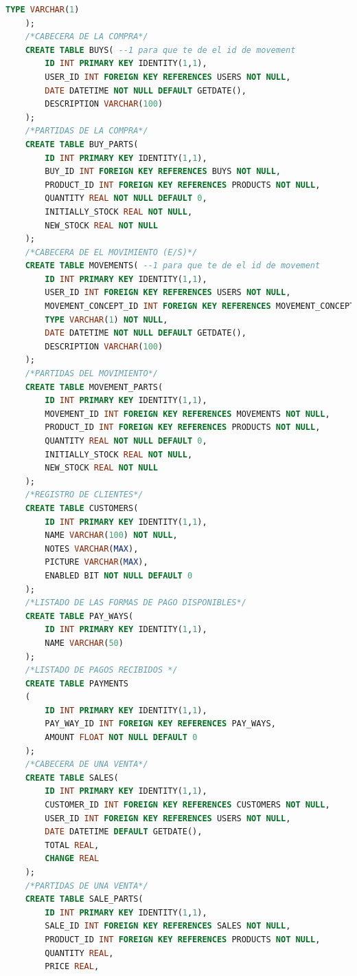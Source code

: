 \documentclass[a4paper,DIV=12]{scrreprt}
\begin{document}
\begin{lstlisting}[language={SQL}]
        TYPE VARCHAR(1)
    );
    /*CABECERA DE LA COMPRA*/
    CREATE TABLE BUYS( --1 para que te de el id de movement
        ID INT PRIMARY KEY IDENTITY(1,1),
        USER_ID INT FOREIGN KEY REFERENCES USERS NOT NULL,
        DATE DATETIME NOT NULL DEFAULT GETDATE(),
        DESCRIPTION VARCHAR(100)
    );
    /*PARTIDAS DE LA COMPRA*/
    CREATE TABLE BUY_PARTS(  
        ID INT PRIMARY KEY IDENTITY(1,1),
        BUY_ID INT FOREIGN KEY REFERENCES BUYS NOT NULL,
        PRODUCT_ID INT FOREIGN KEY REFERENCES PRODUCTS NOT NULL,
        QUANTITY REAL NOT NULL DEFAULT 0,
        INITIALLY_STOCK REAL NOT NULL,
        NEW_STOCK REAL NOT NULL
    );
    /*CABECERA DE EL MOVIMIENTO (E/S)*/
    CREATE TABLE MOVEMENTS( --1 para que te de el id de movement
        ID INT PRIMARY KEY IDENTITY(1,1),
        USER_ID INT FOREIGN KEY REFERENCES USERS NOT NULL,
        MOVEMENT_CONCEPT_ID INT FOREIGN KEY REFERENCES MOVEMENT_CONCEPT NOT NULL,
        TYPE VARCHAR(1) NOT NULL,
        DATE DATETIME NOT NULL DEFAULT GETDATE(),
        DESCRIPTION VARCHAR(100)
    );
    /*PARTIDAS DEL MOVIMIENTO*/
    CREATE TABLE MOVEMENT_PARTS(  
        ID INT PRIMARY KEY IDENTITY(1,1),
        MOVEMENT_ID INT FOREIGN KEY REFERENCES MOVEMENTS NOT NULL,
        PRODUCT_ID INT FOREIGN KEY REFERENCES PRODUCTS NOT NULL,
        QUANTITY REAL NOT NULL DEFAULT 0,
        INITIALLY_STOCK REAL NOT NULL,
        NEW_STOCK REAL NOT NULL
    );
    /*REGISTRO DE CLIENTES*/
    CREATE TABLE CUSTOMERS(
        ID INT PRIMARY KEY IDENTITY(1,1),
        NAME VARCHAR(100) NOT NULL,
        NOTES VARCHAR(MAX),
        PICTURE VARCHAR(MAX),
        ENABLED BIT NOT NULL DEFAULT 0
    );
    /*LISTADO DE LAS FORMAS DE PAGO DISPONIBLES*/
    CREATE TABLE PAY_WAYS(	
        ID INT PRIMARY KEY IDENTITY(1,1),
        NAME VARCHAR(50)
    );
    /*LISTADO DE PAGOS RECIBIDOS */
    CREATE TABLE PAYMENTS
    (
        ID INT PRIMARY KEY IDENTITY(1,1),
        PAY_WAY_ID INT FOREIGN KEY REFERENCES PAY_WAYS,
        AMOUNT FLOAT NOT NULL DEFAULT 0
    );
    /*CABECERA DE UNA VENTA*/
    CREATE TABLE SALES(
        ID INT PRIMARY KEY IDENTITY(1,1),
        CUSTOMER_ID INT FOREIGN KEY REFERENCES CUSTOMERS NOT NULL,
        USER_ID INT FOREIGN KEY REFERENCES USERS NOT NULL,
        DATE DATETIME DEFAULT GETDATE(),
        TOTAL REAL,
        CHANGE REAL
    );
    /*PARTIDAS DE UNA VENTA*/
    CREATE TABLE SALE_PARTS(
        ID INT PRIMARY KEY IDENTITY(1,1),
        SALE_ID INT FOREIGN KEY REFERENCES SALES NOT NULL,
        PRODUCT_ID INT FOREIGN KEY REFERENCES PRODUCTS NOT NULL,
        QUANTITY REAL,
        PRICE REAL,

\end{lstlisting}
\end{document}
